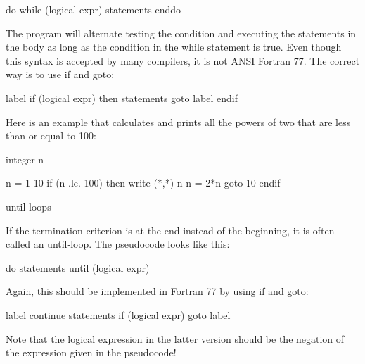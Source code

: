       do while (logical expr) 
         statements
      enddo

The program will alternate testing the condition and executing the statements in the body as long as the condition in the while statement is true. Even though this syntax is accepted by many compilers, it is not ANSI Fortran 77. The correct way is to use if and goto:

label if (logical expr) then
         statements
         goto label
      endif 

Here is an example that calculates and prints all the powers of two that are less than or equal to 100:

     integer n

     n = 1
  10 if (n .le. 100) then
        write (*,*) n
        n = 2*n
        goto 10
     endif

until-loops

If the termination criterion is at the end instead of the beginning, it is often called an until-loop. The pseudocode looks like this:

      do
         statements
      until (logical expr)

Again, this should be implemented in Fortran 77 by using if and goto:

label continue
         statements
      if (logical expr) goto label

Note that the logical expression in the latter version should be the negation of the expression given in the pseudocode! 
